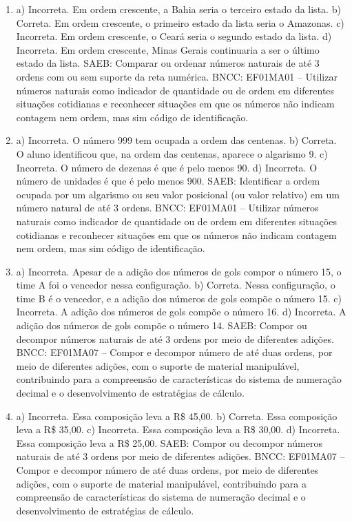 \begin{enumerate}
\item
a) Incorreta. Em ordem crescente, a Bahia seria o terceiro estado da lista.
b) Correta. Em ordem crescente, o primeiro estado da lista seria o Amazonas.
c) Incorreta. Em ordem crescente, o Ceará seria o segundo estado da lista.
d) Incorreta. Em ordem crescente, Minas Gerais continuaria a ser o último estado da lista.
SAEB: Comparar ou ordenar números naturais de até 3 ordens com
ou sem suporte da reta numérica.
BNCC: EF01MA01 -- Utilizar números naturais como indicador de quantidade
ou de ordem em diferentes situações cotidianas e reconhecer situações em
que os números não indicam contagem nem ordem, mas sim código de
identificação.

\item
a) Incorreta. O número 999 tem ocupada a ordem das centenas.
b) Correta. O aluno identificou que, na ordem das centenas, aparece o
algarismo 9.
c) Incorreta. O número de dezenas é que é pelo menos 90.
d) Incorreta. O número de unidades é que é pelo menos 900.
SAEB: Identificar a ordem ocupada por um algarismo ou seu valor
posicional (ou valor relativo) em um número natural de até 3 ordens.
BNCC: EF01MA01 -- Utilizar números naturais como indicador de quantidade
ou de ordem em diferentes situações cotidianas e reconhecer situações em
que os números não indicam contagem nem ordem, mas sim código de
identificação.

\item
a) Incorreta. Apesar de a adição dos números de gols compor o número 15, o time A foi o vencedor nessa configuração.
b) Correta. Nessa configuração, o time B é o vencedor, e a adição dos números de gols compõe o número 15.
c) Incorreta. A adição dos números de gols compõe o número 16.
d) Incorreta. A adição dos números de gols compõe o número 14.
SAEB: Compor ou decompor números naturais de até 3 ordens por
meio de diferentes adições.
BNCC: EF01MA07 -- Compor e decompor número de até duas ordens, por meio
de diferentes adições, com o suporte de material manipulável,
contribuindo para a compreensão de características do sistema de
numeração decimal e o desenvolvimento de estratégias de cálculo.

\item
a) Incorreta. Essa composição leva a R\$ 45,00.
b) Correta. Essa composição leva a R\$ 35,00.
c) Incorreta. Essa composição leva a R\$ 30,00.
d) Incorreta. Essa composição leva a R\$ 25,00.
SAEB: Compor ou decompor números naturais de até 3 ordens por meio
de diferentes adições.
BNCC: EF01MA07 -- Compor e decompor número de até duas ordens, por meio
de diferentes adições, com o suporte de material manipulável,
contribuindo para a compreensão de características do sistema de
numeração decimal e o desenvolvimento de estratégias de cálculo.


\end{enumerate}
